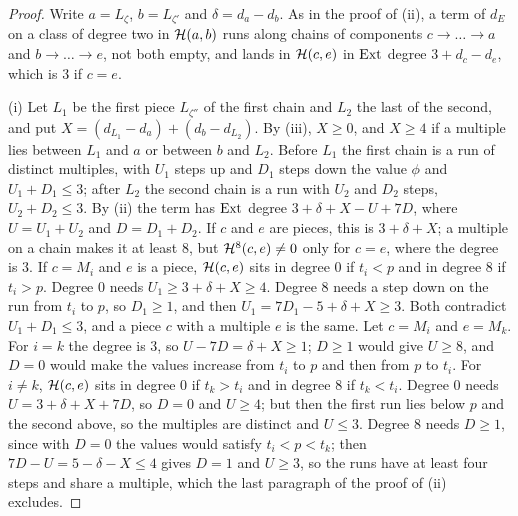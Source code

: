 \begin{proof}
Write $a=L_{\zeta}$, $b=L_{\zeta'}$ and $\delta=d_{a}-d_{b}$. As in the proof
of (ii), a term of $d_{E}$ on a class of degree two
in $\mathcal{H}(a,b)$ runs along chains of components $c\to\dots\to a$ and
$b\to\dots\to e$, not both empty, and lands in $\mathcal{H}(c,e)$ in $\operatorname{Ext}$ degree
$3+d_{c}-d_{e}$, which is $3$ if $c=e$.

(i) Let $L_{1}$ be the first piece $L_{\zeta''}$ of the first chain and
$L_{2}$ the last of the second, and put
$X=(d_{L_{1}}-d_{a})+(d_{b}-d_{L_{2}})$. By (iii),
$X\ge0$, and $X\ge4$ if a multiple lies between $L_{1}$ and $a$ or between
$b$ and $L_{2}$. Before $L_{1}$ the first chain is a run of distinct
multiples, with $U_{1}$ steps up and $D_{1}$ steps down the value $\phi$ and
$U_{1}+D_{1}\le3$; after $L_{2}$ the second chain is a run with $U_{2}$ and
$D_{2}$ steps, $U_{2}+D_{2}\le3$. By (ii) the term has
$\operatorname{Ext}$ degree $3+\delta+X-U+7D$, where $U=U_{1}+U_{2}$ and $D=D_{1}+D_{2}$.
If $c$ and $e$ are pieces, this is $3+\delta+X$; a multiple on a chain makes
it at least $8$, but $\mathcal{H}^{8}(c,e)\ne0$ only for $c=e$, where the degree is
$3$. If $c=M_{i}$ and $e$ is a piece, $\mathcal{H}(c,e)$ sits in degree $0$ if
$t_{i}<p$ and in degree $8$ if $t_{i}>p$. Degree $0$ needs
$U_{1}\ge3+\delta+X\ge4$. Degree $8$ needs a step down on the run from
$t_{i}$ to $p$, so $D_{1}\ge1$, and then
$U_{1}=7D_{1}-5+\delta+X\ge3$. Both contradict $U_{1}+D_{1}\le3$, and a
piece $c$ with a multiple $e$ is the same. Let $c=M_{i}$ and $e=M_{k}$. For
$i=k$ the degree is $3$, so $U-7D=\delta+X\ge1$; $D\ge1$ would give $U\ge8$,
and $D=0$ would make the values increase from $t_{i}$ to $p$ and then from
$p$ to $t_{i}$. For $i\ne k$, $\mathcal{H}(c,e)$ sits in degree $0$ if $t_{k}>t_{i}$
and in degree $8$ if $t_{k}<t_{i}$. Degree $0$ needs $U=3+\delta+X+7D$, so
$D=0$ and $U\ge4$; but then the first run lies below $p$ and the second
above, so the multiples are distinct and $U\le3$. Degree $8$ needs $D\ge1$,
since with $D=0$ the values would satisfy $t_{i}<p<t_{k}$; then
$7D-U=5-\delta-X\le4$ gives $D=1$ and $U\ge3$, so the runs have at least
four steps and share a multiple, which the last paragraph of the proof of
(ii) excludes.


\end{proof}
